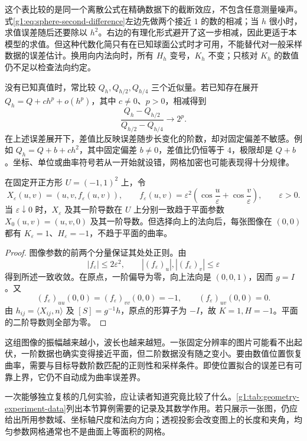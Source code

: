 这个表比较的是同一个离散公式在精确数据下的截断效应，不包含任意测量噪声。式\eqref{g1:eq:sphere-second-difference}左边先做两个接近 \(1\) 的数的相减；当 \(h\) 很小时，求值误差随后还要除以 \(h^2\)。右边的有理化形式避开了这一步相减，因此更适于本模型的求值。但这种代数化简只有在已知球面公式时才可用，不能替代对一般采样数据的误差估计。换用向内法向时，所有 \(H_h\) 变号，\(K_h\) 不变；只核对 \(K_h\) 的数值仍不足以检查法向约定。

\ProseParagraphBreak

没有已知真值时，常比较 \(Q_h,Q_{h/2},Q_{h/4}\) 三个近似量。若已知存在展开 \(Q_h=Q+ch^p+o(h^p)\)，其中 \(c\ne0\)、\(p>0\)，相减得到
\[
	\frac{Q_h-Q_{h/2}}{Q_{h/2}-Q_{h/4}}\longrightarrow2^p.
\]
在上述误差展开下，差值比反映误差随步长变化的阶数，却对固定偏差不敏感。例如 \(Q_h=Q+b+ch^2\)，其中固定偏差 \(b\ne0\)，差值比仍恒等于 \(4\)，极限却是 \(Q+b\)。坐标、单位或曲率符号若从一开始就设错，网格加密也可能表现得十分规律。

\begin{proposition}\label{g1:prop:position-does-not-control-curvature}
	在固定开正方形 \(U=(-1,1)^2\) 上，令
	\[
		X_\varepsilon(u,v)=(u,v,f_\varepsilon(u,v)),\qquad
		f_\varepsilon(u,v)=\varepsilon^2
		\left(\cos\frac u\varepsilon+\cos\frac v\varepsilon\right),
		\qquad \varepsilon>0.
	\]
	当 \(\varepsilon\downarrow0\) 时，\(X_\varepsilon\) 及其一阶导数在 \(U\) 上分别一致趋于平面参数 \(X_0(u,v)=(u,v,0)\) 及其一阶导数。但选择向上的法向后，每张图像在 \((0,0)\) 都有 \(K_\varepsilon=1\)、\(H_\varepsilon=-1\)，不趋于平面的曲率。
\end{proposition}
\begin{proof}
	图像参数的前两个分量保证其处处正则。由
	\[
		|f_\varepsilon|\le2\varepsilon^2,\qquad
		|(f_\varepsilon)_u|,|(f_\varepsilon)_v|\le\varepsilon
	\]
	得到所述一致收敛。在原点，一阶偏导为零，向上法向是 \((0,0,1)\)，因而 \(g=I\)。又
	\[
		(f_\varepsilon)_{uu}(0,0)=(f_\varepsilon)_{vv}(0,0)=-1,
		\qquad(f_\varepsilon)_{uv}(0,0)=0.
	\]
	由 \(h_{ij}=\langle X_{ij},n\rangle\) 及 \([S]=g^{-1}h\)，原点的形算子为 \(-I\)，故 \(K=1,H=-1\)。平面的二阶导数则全部为零。
\end{proof}

这组图像的振幅越来越小，波长也越来越短。一张固定分辨率的图片可能看不出起伏，一阶数据也确实变得接近平面，但二阶数据没有随之变小。要由数值位置恢复曲率，需要与目标导数阶数匹配的正则性和采样条件。即使位置拟合的误差已有可靠上界，它仍不自动成为曲率误差界。

\ProseParagraphBreak

一次能够独立复核的几何实验，应让读者知道究竟比较了什么。\cref{g1:tab:geometry-experiment-data}列出本节算例需要的记录及其数学作用。若只展示一张图，仍应给出所用参数域、坐标轴尺度和法向方向；透视投影会改变图上的长度和夹角，均匀参数网格通常也不是曲面上等面积的网格。


